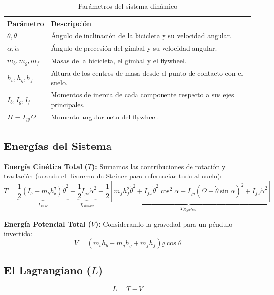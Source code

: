 \documentclass[12pt,letterpaper]{report}
\begin{document}
\begin{table}[H]
\centering
\begin{tabular}{|l|l|}
\hline
\textbf{Parámetro} & \textbf{Descripción} \\ \hline
$\theta, \dot{\theta}$ & Ángulo de inclinación de la bicicleta y su velocidad angular. \\ \hline
$\alpha, \dot{\alpha}$ & Ángulo de precesión del gimbal y su velocidad angular. \\ \hline
$m_b, m_g, m_f$ & Masas de la bicicleta, el gimbal y el flywheel. \\ \hline
$h_b, h_g, h_f$ & Altura de los centros de masa desde el punto de contacto con el suelo. \\ \hline
$I_b, I_g, I_f$ & Momentos de inercia de cada componente respecto a sus ejes principales. \\ \hline
$H = I_{fy} \Omega$ & Momento angular neto del flywheel. \\ \hline
\end{tabular}
\caption{Parámetros del sistema dinámico}
\label{tab:parametros}
\end{table}

\subsection*{Energías del Sistema}

\textbf{Energía Cinética Total ($T$):}
Sumamos las contribuciones de rotación y traslación (usando el Teorema de Steiner para referenciar todo al suelo):
\begin{equation}
    T = \underbrace{\frac{1}{2}(I_b + m_b h_b^2)\dot{\theta}^2}_{T_{Bike}} + \underbrace{\frac{1}{2}I_{gz}\dot{\alpha}^2}_{T_{Gimbal}} + \underbrace{\frac{1}{2}[m_f h_f^2 \dot{\theta}^2 + I_{fx}\dot{\theta}^2 \cos^2\alpha + I_{fy}(\Omega + \dot{\theta} \sin\alpha)^2 + I_{fz}\dot{\alpha}^2]}_{T_{Flywheel}}
\end{equation}

\textbf{Energía Potencial Total ($V$):}
Considerando la gravedad para un péndulo invertido:
\begin{equation}
    V = (m_b h_b + m_g h_g + m_f h_f) g \cos\theta
\end{equation}

\subsection*{El Lagrangiano \texorpdfstring{($L$)}{(L)}}
\begin{equation}
    L = T - V
\end{equation}
\end{document}
